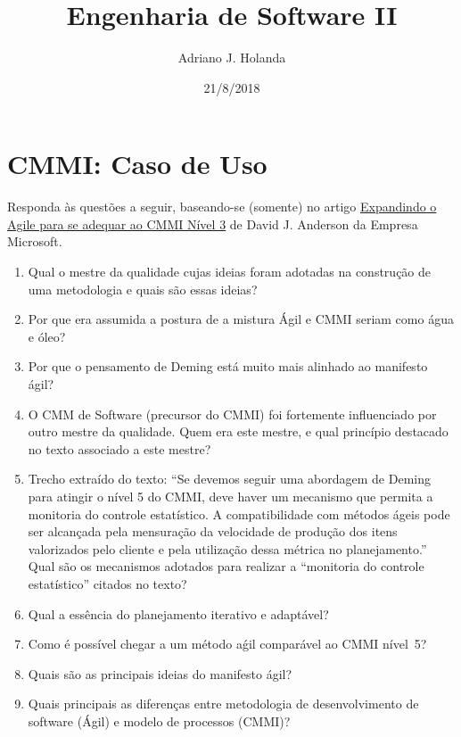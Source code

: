 \documentclass[12pt]{../notes}
\title{Engenharia de Software II}
\author{Adriano J. Holanda}
\date{21/8/2018}
\begin{document}
\maketitle

\section*{CMMI: Caso de Uso}

Responda às questões a seguir, baseando-se (somente) no artigo
\href{https://msdn.microsoft.com/pt-br/library/cc517970.aspx}{Expandindo
  o Agile para se adequar ao CMMI Nível 3} de David J. Anderson da
Empresa Microsoft.

\begin{enumerate}
\item Qual o mestre da qualidade cujas ideias foram adotadas na construção
  de uma metodologia e quais são essas ideias?

\item Por que era assumida a postura de a mistura Ágil e CMMI seriam como
  água e óleo?

\item Por que o pensamento de Deming está muito mais alinhado ao manifesto ágil?

\item O CMM de Software (precursor do CMMI) foi fortemente influenciado
  por outro mestre da qualidade. Quem era este mestre, e qual princípio
  destacado no texto associado a este mestre?

\item Trecho extraído do texto: ``Se devemos seguir uma abordagem de
  Deming para atingir o nível 5 do CMMI, deve haver um mecanismo que
  permita a monitoria do controle estatístico. A compatibilidade com
  métodos ágeis pode ser alcançada pela mensuração da velocidade de
  produção dos itens valorizados pelo cliente e pela utilização dessa
  métrica no planejamento.'' \\Qual são os mecanismos adotados para
  realizar a ``monitoria do controle estatístico'' citados no texto?

\item Qual a essência do planejamento iterativo e adaptável?
  
\item Como é possível chegar a um método aǵil comparável ao CMMI nível~5?
  
\item Quais são as principais ideias do manifesto ágil?

\item Quais principais as diferenças entre metodologia de
  desenvolvimento de software (Ágil) e modelo de processos (CMMI)?

  
\end{enumerate}
\end{document}
